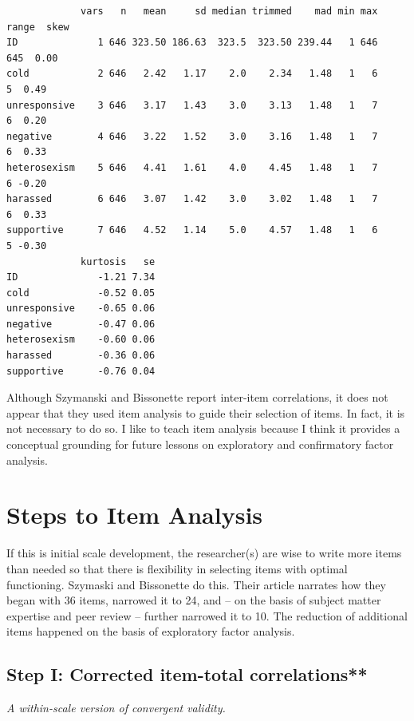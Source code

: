 \documentclass[
  english,
]{book}
\begin{document}
\begin{verbatim}
             vars   n   mean     sd median trimmed    mad min max range  skew
ID              1 646 323.50 186.63  323.5  323.50 239.44   1 646   645  0.00
cold            2 646   2.42   1.17    2.0    2.34   1.48   1   6     5  0.49
unresponsive    3 646   3.17   1.43    3.0    3.13   1.48   1   7     6  0.20
negative        4 646   3.22   1.52    3.0    3.16   1.48   1   7     6  0.33
heterosexism    5 646   4.41   1.61    4.0    4.45   1.48   1   7     6 -0.20
harassed        6 646   3.07   1.42    3.0    3.02   1.48   1   7     6  0.33
supportive      7 646   4.52   1.14    5.0    4.57   1.48   1   6     5 -0.30
             kurtosis   se
ID              -1.21 7.34
cold            -0.52 0.05
unresponsive    -0.65 0.06
negative        -0.47 0.06
heterosexism    -0.60 0.06
harassed        -0.36 0.06
supportive      -0.76 0.04
\end{verbatim}

Although Szymanski and Bissonette report inter-item correlations, it does not appear that they used item analysis to guide their selection of items. In fact, it is not necessary to do so. I like to teach item analysis because I think it provides a conceptual grounding for future lessons on exploratory and confirmatory factor analysis.

\hypertarget{steps-to-item-analysis}{%
\section{Steps to Item Analysis}\label{steps-to-item-analysis}}

If this is initial scale development, the researcher(s) are wise to write more items than needed so that there is flexibility in selecting items with optimal functioning. Szymaski and Bissonette \citeyearpar{szymanski_perceptions_2020} do this. Their article narrates how they began with 36 items, narrowed it to 24, and -- on the basis of subject matter expertise and peer review -- further narrowed it to 10. The reduction of additional items happened on the basis of exploratory factor analysis.

\hypertarget{step-i-corrected-item-total-correlations}{%
\subsection{Step I: Corrected item-total correlations**}\label{step-i-corrected-item-total-correlations}}

\emph{A within-scale version of convergent validity.}
\end{document}
